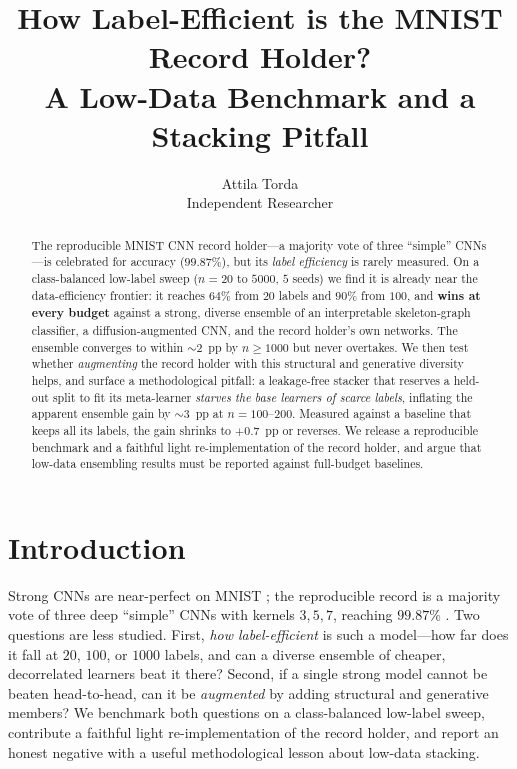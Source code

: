 \documentclass{article}
\title{How Label-Efficient is the MNIST Record Holder?\\
       A Low-Data Benchmark and a Stacking Pitfall}
\author{%
  Attila Torda \\
  Independent Researcher
}
\begin{document}
\maketitle

\begin{abstract}
The reproducible MNIST CNN record holder---a majority vote of three ``simple'' CNNs---is
celebrated for accuracy ($99.87\%$), but its \emph{label efficiency} is rarely measured. On a
class-balanced low-label sweep ($n=20$ to $5000$, $5$ seeds) we find it is already near the
data-efficiency frontier: it reaches $64\%$ from $20$ labels and $90\%$ from $100$, and
\textbf{wins at every budget} against a strong, diverse ensemble of an interpretable
skeleton-graph classifier, a diffusion-augmented CNN, and the record holder's own networks. The
ensemble converges to within $\sim$2~pp by $n\!\geq\!1000$ but never overtakes. We then test
whether \emph{augmenting} the record holder with this structural and generative diversity helps,
and surface a methodological pitfall: a leakage-free stacker that reserves a held-out split to
fit its meta-learner \emph{starves the base learners of scarce labels}, inflating the apparent
ensemble gain by $\sim$3~pp at $n\!=\!100$--$200$. Measured against a baseline that keeps all its
labels, the gain shrinks to $+0.7$~pp or reverses. We release a reproducible benchmark and a
faithful light re-implementation of the record holder, and argue that low-data ensembling
results must be reported against full-budget baselines.
\end{abstract}

\section{Introduction}
Strong CNNs are near-perfect on MNIST \cite{LeCun1998}; the reproducible record is a majority
vote of three deep ``simple'' CNNs with kernels $3,5,7$, reaching $99.87\%$ \cite{An2020}. Two
questions are less studied. First, \emph{how label-efficient} is such a model---how far does it
fall at $20$, $100$, or $1000$ labels, and can a diverse ensemble of cheaper, decorrelated
learners beat it there? Second, if a single strong model cannot be beaten head-to-head, can it
be \emph{augmented} by adding structural and generative members? We benchmark both questions on a
class-balanced low-label sweep, contribute a faithful light re-implementation of the record
holder, and report an honest negative with a useful methodological lesson about low-data
stacking.
\end{document}
